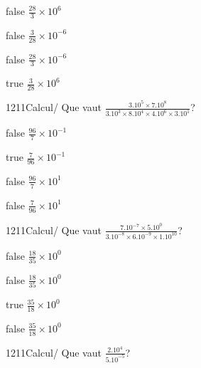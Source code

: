 \documentclass[11pt]{article}
\begin{document}
            \begin{reponses}
                \item[false] $\frac{28}{3}\times 10^{6}$
                \item[false] $\frac{3}{28}\times 10^{-6}$
                \item[false] $\frac{28}{3}\times 10^{-6}$
                \item[true] $\frac{3}{28}\times 10^{6}$
            \end{reponses}
            
            \begin{question}{1211}{Calcul}{}{/}
                Que vaut $\frac{3.10^{5}\times 7.10^{8}}{3.10^{3}\times 8.10^{4}\times 4.10^{6}\times 3.10^{1}}$?
            \end{question}
            
            \begin{reponses}
                \item[false] $\frac{96}{7}\times 10^{-1}$
                \item[true] $\frac{7}{96}\times 10^{-1}$
                \item[false] $\frac{96}{7}\times 10^{1}$
                \item[false] $\frac{7}{96}\times 10^{1}$
            \end{reponses}
            
            \begin{question}{1211}{Calcul}{}{/}
                Que vaut $\frac{7.10^{-7}\times 5.10^{0}}{3.10^{-8}\times 6.10^{-9}\times 1.10^{10}}$?
            \end{question}
            
            \begin{reponses}
                \item[false] $\frac{18}{35}\times 10^{0}$
                \item[false] $\frac{18}{35}\times 10^{0}$
                \item[true] $\frac{35}{18}\times 10^{0}$
                \item[false] $\frac{35}{18}\times 10^{0}$
            \end{reponses}
            
            \begin{question}{1211}{Calcul}{}{/}
                Que vaut $\frac{2.10^{4}}{5.10^{-5}}$?
            \end{question}
            
\end{document}
